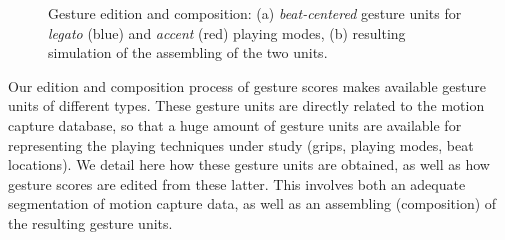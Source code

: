 \begin{figure}%
	\begin{center}
		\hspace{6mm}
	\end{center}
	\vspace{-0.5cm}
	\caption[Gesture edition and composition]{Gesture edition and composition: (a) \emph{beat-centered} gesture units for \emph{legato} (blue) and \emph{accent} (red) playing modes, (b) resulting simulation of the assembling of the two units.}
	\label{fig:FrenchGermanGrips_Sim}
\end{figure}
		
Our edition and composition process of gesture scores makes available gesture units of different types. These gesture units are directly related to the motion capture database, so that a huge amount of gesture units are available for representing the playing techniques under study (grips, playing modes, beat locations). We detail here how these gesture units are obtained, as well as how gesture scores are edited from these latter. This involves both an adequate segmentation of motion capture data, as well as an assembling (composition) of the resulting gesture units.\\

